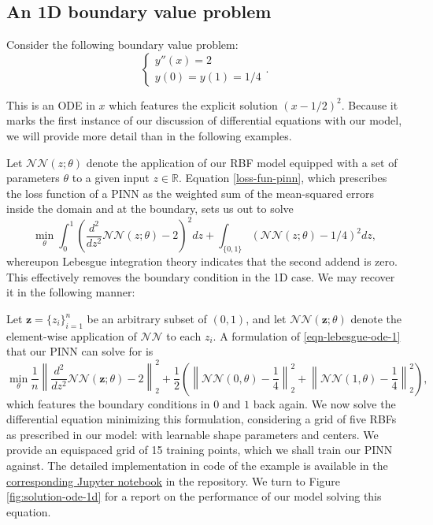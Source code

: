 \documentclass[12pt]{report} %
\newcommand{\tmmathbf}[1]{\ensuremath{\boldsymbol{#1}}}
\begin{document}
\subsection*{An 1D boundary value problem}

Consider the following boundary value problem:
\[ \left\{\begin{array}{l}
    y'' (x) = 2 \\
    y (0) = y (1) = 1 / 4
  \end{array}\right. . \]

This is an ODE in $x$ which features the explicit solution $(x - 1 / 2)^2$.
Because it marks the first instance of our discussion of differential equations
with our model, we will provide more detail than in the following examples.

Let $\mathcal{N}\mathcal{N} (z ; \theta)$ denote the application of our RBF
model equipped with a set of parameters $\theta$ to a given input $z \in
  \mathbb{R}$. Equation \eqref{loss-fun-pinn}, which prescribes the loss function
of a PINN as the weighted sum of the mean-squared errors inside the domain and at
the boundary, sets us out to solve
\begin{equation}
  \min_{\theta}  \int_0^1 \left( \frac{d^2}{d z^2} \mathcal{N}\mathcal{N} (z ;
    \theta) - 2 \right)^2 d z + \int_{\{ 0, 1 \}} (\mathcal{N}\mathcal{N} (z ;
  \theta) - 1 / 4)^2 d z, \label{eqn-lebesgue-ode-1}
\end{equation}
whereupon Lebesgue integration theory indicates that the second addend is zero.
This effectively removes the boundary condition in the 1D case. We may
recover it in the following manner:

Let $\tmmathbf{z}= \{ z_i \}_{i = 1}^n$ be an arbitrary subset of $(0, 1)$,
and let $\mathcal{N}\mathcal{N} (\tmmathbf{z}; \theta)$ denote the
element-wise application of $\mathcal{N}\mathcal{N}$ to each $z_i$. A
formulation of \eqref{eqn-lebesgue-ode-1} that our PINN can solve for is
\[ \min_{\theta}  \frac{1}{n} \left\| \frac{d^2}{d z^2} \mathcal{N}\mathcal{N}
  (\tmmathbf{z}; \theta) - 2 \right\|_2^2 + \frac{1}{2} \left( \left\|
  \mathcal{N}\mathcal{N} (0, \theta) - \frac{1}{4} \right\|_2^2 + \left\|
  \mathcal{N}\mathcal{N} (1, \theta) - \frac{1}{4} \right\|_2^2 \right), \]
which features the boundary conditions in $0$ and $1$ back again. We now solve the
differential equation minimizing this formulation, considering a grid of
five RBFs as prescribed in our model: with learnable shape parameters and centers.
We provide an equispaced grid of 15 training points, which we shall train our
PINN against.
The detailed implementation in code of the example is available in the
\href{https://github.com/heqro/tfm-experiments/blob/main/introductory_notebooks/solving_diff_eqs/1d/ode_example_1.ipynb}{corresponding Jupyter notebook}
in the repository.
We turn to Figure \ref{fig:solution-ode-1d} for a report on the performance of our
model solving this equation.
\end{document}
